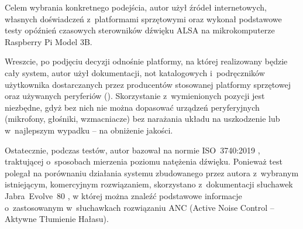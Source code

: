 Celem wybrania konkretnego podejścia, autor użył źródeł internetowych, własnych doświadczeń z~platformami sprzętowymi oraz wykonał podstawowe testy opóźnień czasowych sterowników dźwięku ALSA na mikrokomputerze Raspberry Pi Model 3B.

Wreszcie, po podjęciu decyzji odnośnie platformy, na której realizowany będzie cały system, autor użył dokumentacji, not katalogowych i~podręczników użytkownika dostarczanych przez producentów stosowanej platformy sprzętowej oraz używanych peryferiów (\cite{speakeropamp, RM0390}). Skorzystanie z~wymienionych pozycji jest niezbędne, gdyż bez nich nie można dopasować urządzeń peryferyjnych (mikrofony, głośniki, wzmacniacze) bez narażania układu na uszkodzenie lub w~najlepszym wypadku -- na obniżenie jakości.

Ostatecznie, podczas testów, autor bazował na normie ISO~3740:2019 \cite{test_norm}, traktującej o~sposobach mierzenia poziomu natężenia dźwięku. Ponieważ test polegał na porównaniu działania systemu zbudowanego przez autora z~wybranym istniejącym, komercyjnym rozwiązaniem, skorzystano z~dokumentacji słuchawek Jabra~Evolve~80 \cite{JabraEvolve80}, w której można znaleźć podstawowe informacje o~zastosowanym w~słuchawkach rozwiązaniu ANC (Active Noise Control -- Aktywne Tłumienie Hałasu).